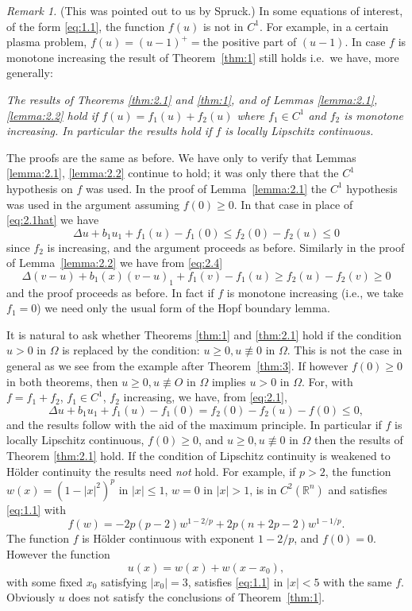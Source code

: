  \emph{Remark 1.} (This was pointed out to us by Spruck.)
In some equations of interest, of the form \eqref{eq:1.1},
the function $f(u)$ is not in $C^1$. For example, in a certain plasma problem,
$f(u)=(u-1)^+ =$the positive part of $(u-1)$. In case $f$ is monotone increasing
the result of Theorem~\ref{thm:1} still holds i.e.~we have, more generally:

{\itshape The results of Theorems \ref{thm:2.1} and \ref{thm:1},
and of Lemmas \ref{lemma:2.1}, \ref{lemma:2.2} hold if $f(u)= f_1(u) + f_2(u)$
where $f_1\in C^1$ and $f_2$ is monotone increasing. In particular the results hold if
$f$ is locally Lipschitz continuous.}

The proofs are the same as before. We have only to verify that Lemmas \ref{lemma:2.1},
\ref{lemma:2.2} continue to hold; it was only there that the $C^1$ hypothesis on $f$ was used.
In the proof of Lemma~\ref{lemma:2.1} the $C^1$ hypothesis was used in the argument
assuming $f(0)\geq 0$. In that case in place of \eqref{eq:2.1hat} we have
\[\Delta u + b_1u_1 + f_1(u) - f_1(0) \leq f_2(0) - f_2(u) \leq 0\]
since $f_2$ is increasing, and the argument proceeds as before.
Similarly in the proof of Lemma~\ref{lemma:2.2} we have from \eqref{eq:2.4}
\[\Delta(v-u) + b_1(x)(v-u)_1 + f_1(v) - f_1(u) \geq f_2(u) - f_2(v) \geq 0\]
and the proof proceeds as before.
In fact if $f$ is monotone increasing (i.e., we take $f_1=0$)
we need only the usual form of the Hopf boundary lemma.

It is natural to ask whether Theorems \ref{thm:1} and \ref{thm:2.1} hold 
if the condition $u > 0$ in $\Omega$ is replaced by the condition: $u \geq 0, u \not\equiv 0$
in $\Omega$. This is not the case in general as we see from the example after Theorem~\ref{thm:3}. 
If however $f(0)\geq 0$ in both theorems, then $u\geq 0, u\not\equiv O$ in $\Omega$ 
implies $u>0$ in $\Omega$. For, with $f=f_1 + f_2$, $f_1\in C^1$, $f_2$ increasing,
we have, from \eqref{eq:2.1},
\[\Delta u + b_1u_1 + f_1(u) - f_1(0)
  = f_2(0) - f_2(u) - f(0) \leq 0,\]
and the results follow with the aid of the maximum principle.
In particular if $f$ is locally Lipschitz continuous, $f(0) \geq 0$,
and $u\geq 0, u\not\equiv 0$ in $\Omega$ then the results of Theorem \ref{thm:2.1} hold.
If the condition of Lipschitz continuity is weakened to H\"older continuity
the results need \emph{not} hold.
For example, if $p>2$, the function $w(x)=(1-|x|^2)^p$ in $|x|\leq 1$,
$w=0$ in $|x|>1$, is in $C^2(\mathbb{R}^n)$ and satisfies \eqref{eq:1.1} with
\[f(w) = -2p(p-2)w^{1-2/p} + 2p(n+2p-2)w^{1-1/p}.\]
The function $f$ is H\"older continuous with exponent $1-2/p$, and $f(0)=0$.
However the function
\[u(x) = w(x) + w(x-x_0),\]
with some fixed $x_0$ satisfying $|x_0|=3$, satisfies \eqref{eq:1.1}
in $|x|<5$ with the same $f$.
Obviously $u$ does not satisfy the conclusions of Theorem~\ref{thm:1}.

